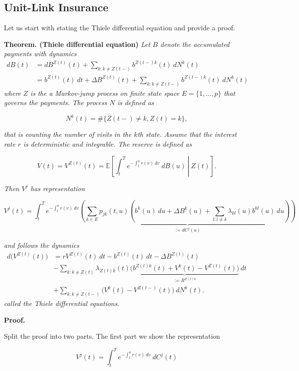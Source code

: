 \documentclass[a4paper,12pt,openany]{book}
\begin{document}
\hypertarget{unit-link-insurance}{%
\subsection{Unit-Link Insurance}\label{unit-link-insurance}}

Let us start with stating the Thiele differential equation and provide a proof.

\textbf{Theorem. (Thiele differential equation)} \emph{Let \(B\) denote the accumulated payments with dynamics}
\begin{align*}
dB(t)&=dB^{Z(t)}(t)+\sum_{k:k\ne Z(t-)}b^{Z(t-)k}(t)\ dN^k(t)\\
&=b^{Z(t)}(t)\ dt+\Delta B^{Z(t)}(t)+\sum_{k:k\ne Z(t-)}b^{Z(t-)k}(t)\ dN^k(t)
\end{align*}
\emph{where \(Z\) is the a Markov-jump process on finite state space \(E=\{1,...,p\}\) that governs the payments. The process \(N\) is defined as}

\[
N^k(t)=\#\{Z(t-)\ne k,Z(t)=k\},
\]

\emph{that is counting the number of visits in the \(k\)th state. Assume that the interest rate \(r\) is deterministic and integrable. The reserve is defined as}

\[
V(t)=V^{Z(t)}(t)=\mathbb E\left[\left.\int_t^Te^{-\int_t^u r(v)\ dv}\ dB(u)\ \right\vert\ Z(t)\right].
\]

\emph{Then \(V^j\) has representation}

\[
V^j(t)=\int_t^Te^{-\int_t^ur(v)\ dv}\underbrace{\left(\sum_{k\in E}p_{jk}(t,u)\left(b^k(u)\ du+\Delta B^k(u)+\sum_{l:l\ne k}\lambda_{kl}(u)b^{kl}(u)\ du\right)\right)}_{:= dC^j(u)}
\]

\emph{and follows the dynamics}
\begin{align*}
d\Big(V^{Z(t)}(t)\Big)&=rV^{Z(t)}(t)\ dt-b^{Z(t)}(t)\ dt -\Delta B^{Z(t)}(t)\\
&-\sum_{k : k\ne Z(t)}\lambda_{Z(t)k}(t)\underbrace{\Big(b^{Z(t)k}(t)+V^k(t)-V^{Z(t)}(t)\Big)}_{:=R^{Z(t)k}}\ dt\\
&+\sum_{k : k\ne Z(t-)}\Big(V^k(t)-V^{Z(t-)}(t)\Big)\ dN^k(t).
\end{align*}
\emph{called the Thiele differential equations.}

\textbf{Proof.}

Split the proof into two parts. The first part we show the representation

\[
V^j(t)=\int_t^Te^{-\int_t^ur(v)\ dv}\ dC^j(t)
\]
\end{document}
